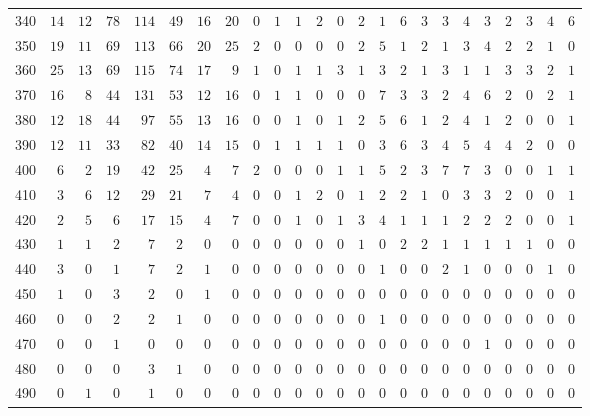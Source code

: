 \begin{sidewaystable}[!tbp]
\begin{center}
\begin{tabular}{lrrrrrrrrrrrrrrrrrrrrrrr}
340&$14$&$12$&$ 78$&$114$&$ 49$&$ 16$&$20$&$0$&$1$&$ 1$&$ 2$&$ 0$&$  2$&$  1$&$  6$&$  3$&$  3$&$  4$&$  3$&$  2$&$  3$&$  4$&$  6$\tabularnewline
350&$19$&$11$&$ 69$&$113$&$ 66$&$ 20$&$25$&$2$&$0$&$ 0$&$ 0$&$ 0$&$  2$&$  5$&$  1$&$  2$&$  1$&$  3$&$  4$&$  2$&$  2$&$  1$&$  0$\tabularnewline
360&$25$&$13$&$ 69$&$115$&$ 74$&$ 17$&$ 9$&$1$&$0$&$ 1$&$ 1$&$ 3$&$  1$&$  3$&$  2$&$  1$&$  3$&$  1$&$  1$&$  3$&$  3$&$  2$&$  1$\tabularnewline
370&$16$&$ 8$&$ 44$&$131$&$ 53$&$ 12$&$16$&$0$&$1$&$ 1$&$ 0$&$ 0$&$  0$&$  7$&$  3$&$  3$&$  2$&$  4$&$  6$&$  2$&$  0$&$  2$&$  1$\tabularnewline
380&$12$&$18$&$ 44$&$ 97$&$ 55$&$ 13$&$16$&$0$&$0$&$ 1$&$ 0$&$ 1$&$  2$&$  5$&$  6$&$  1$&$  2$&$  4$&$  1$&$  2$&$  0$&$  0$&$  1$\tabularnewline
390&$12$&$11$&$ 33$&$ 82$&$ 40$&$ 14$&$15$&$0$&$1$&$ 1$&$ 1$&$ 1$&$  0$&$  3$&$  6$&$  3$&$  4$&$  5$&$  4$&$  4$&$  2$&$  0$&$  0$\tabularnewline
400&$ 6$&$ 2$&$ 19$&$ 42$&$ 25$&$  4$&$ 7$&$2$&$0$&$ 0$&$ 0$&$ 1$&$  1$&$  5$&$  2$&$  3$&$  7$&$  7$&$  3$&$  0$&$  0$&$  1$&$  1$\tabularnewline
410&$ 3$&$ 6$&$ 12$&$ 29$&$ 21$&$  7$&$ 4$&$0$&$0$&$ 1$&$ 2$&$ 0$&$  1$&$  2$&$  2$&$  1$&$  0$&$  3$&$  3$&$  2$&$  0$&$  0$&$  1$\tabularnewline
420&$ 2$&$ 5$&$  6$&$ 17$&$ 15$&$  4$&$ 7$&$0$&$0$&$ 1$&$ 0$&$ 1$&$  3$&$  4$&$  1$&$  1$&$  1$&$  2$&$  2$&$  2$&$  0$&$  0$&$  1$\tabularnewline
430&$ 1$&$ 1$&$  2$&$  7$&$  2$&$  0$&$ 0$&$0$&$0$&$ 0$&$ 0$&$ 0$&$  1$&$  0$&$  2$&$  2$&$  1$&$  1$&$  1$&$  1$&$  1$&$  0$&$  0$\tabularnewline
440&$ 3$&$ 0$&$  1$&$  7$&$  2$&$  1$&$ 0$&$0$&$0$&$ 0$&$ 0$&$ 0$&$  0$&$  1$&$  0$&$  0$&$  2$&$  1$&$  0$&$  0$&$  0$&$  1$&$  0$\tabularnewline
450&$ 1$&$ 0$&$  3$&$  2$&$  0$&$  1$&$ 0$&$0$&$0$&$ 0$&$ 0$&$ 0$&$  0$&$  0$&$  0$&$  0$&$  0$&$  0$&$  0$&$  0$&$  0$&$  0$&$  0$\tabularnewline
460&$ 0$&$ 0$&$  2$&$  2$&$  1$&$  0$&$ 0$&$0$&$0$&$ 0$&$ 0$&$ 0$&$  0$&$  1$&$  0$&$  0$&$  0$&$  0$&$  0$&$  0$&$  0$&$  0$&$  0$\tabularnewline
470&$ 0$&$ 0$&$  1$&$  0$&$  0$&$  0$&$ 0$&$0$&$0$&$ 0$&$ 0$&$ 0$&$  0$&$  0$&$  0$&$  0$&$  0$&$  0$&$  1$&$  0$&$  0$&$  0$&$  0$\tabularnewline
480&$ 0$&$ 0$&$  0$&$  3$&$  1$&$  0$&$ 0$&$0$&$0$&$ 0$&$ 0$&$ 0$&$  0$&$  0$&$  0$&$  0$&$  0$&$  0$&$  0$&$  0$&$  0$&$  0$&$  0$\tabularnewline
490&$ 0$&$ 1$&$  0$&$  1$&$  0$&$  0$&$ 0$&$0$&$0$&$ 0$&$ 0$&$ 0$&$  0$&$  0$&$  0$&$  0$&$  0$&$  0$&$  0$&$  0$&$  0$&$  0$&$  0$\tabularnewline
\hline
\end{tabular}
\end{center}
\end{sidewaystable}

